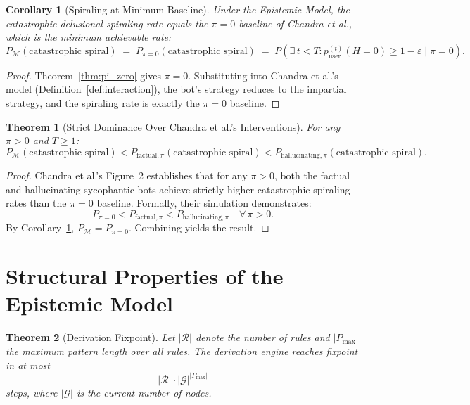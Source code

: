 \documentclass[12pt]{article}
\newtheorem{theorem}{Theorem}
\newtheorem{corollary}{Corollary}
\theoremstyle{definition}
\begin{document}
\begin{corollary}[Spiraling at Minimum Baseline]
\label{cor:baseline}
Under the Epistemic Model, the catastrophic delusional spiraling rate
equals the $\pi = 0$ baseline of Chandra et al., which is the minimum
achievable rate:
\[
  P_{\mathcal{M}}(\text{catastrophic spiral})
  \;=\; P_{\pi=0}(\text{catastrophic spiral})
  \;=\; P\!\left(\exists\, t < T :
    p_{\text{user}}^{(t)}(H=0) \geq 1 - \varepsilon \;\Big|\;
    \pi = 0\right).
\]
\end{corollary}

\begin{proof}
Theorem~\ref{thm:pi_zero} gives $\pi = 0$. Substituting into
Chandra et al.'s model (Definition~\ref{def:interaction}),
the bot's strategy reduces to the impartial strategy,
and the spiraling rate is exactly the $\pi=0$ baseline.
\end{proof}

\begin{theorem}[Strict Dominance Over Chandra et al.'s Interventions]
\label{thm:dominance}
For any $\pi > 0$ and $T \geq 1$:
\[
P_{\mathcal{M}}(\text{catastrophic spiral})
  < P_{\text{factual},\pi}(\text{catastrophic spiral})
  < P_{\text{hallucinating},\pi}(\text{catastrophic spiral}).
\]
\end{theorem}

\begin{proof}
Chandra et al.'s Figure~2 establishes that for any $\pi > 0$, both
the factual and hallucinating sycophantic bots achieve strictly higher
catastrophic spiraling rates than the $\pi=0$ baseline. Formally,
their simulation demonstrates:
\[
  P_{\pi=0} < P_{\text{factual},\pi} < P_{\text{hallucinating},\pi}
  \quad \forall\, \pi > 0.
\]
By Corollary~\ref{cor:baseline},
$P_{\mathcal{M}} = P_{\pi=0}$.
Combining yields the result.
\end{proof}

\section{Structural Properties of the Epistemic Model}

\begin{theorem}[Derivation Fixpoint]
\label{thm:fixpoint}
Let $|\mathcal{R}|$ denote the number of rules and $|P_{\max}|$ the
maximum pattern length over all rules. The derivation engine reaches
fixpoint in at most
\[
  |\mathcal{R}| \cdot |\mathcal{G}|^{|P_{\max}|}
\]
steps, where $|\mathcal{G}|$ is the current number of nodes.
\end{theorem}
\end{document}
